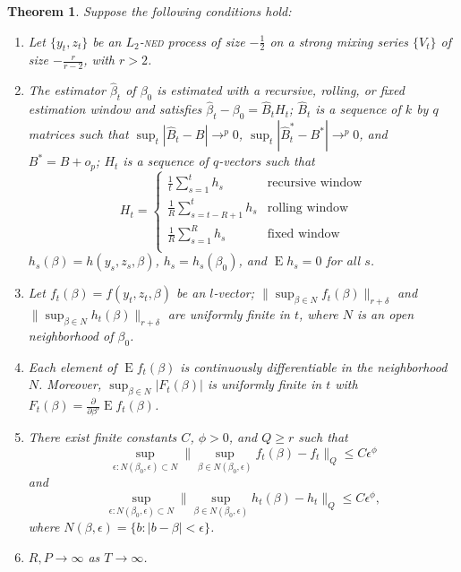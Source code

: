\documentclass[11pt,fleqn]{article}
\newtheorem{thm}{Theorem}
\theoremstyle{definition}
\DeclareMathOperator{\E}{E}
\newcommand{\dd}[1]{\frac{\partial}{\partial #1}}
\newcommand{\ned}{\textsc{ned}}
\begin{document}
\begin{thm}\label{res:3}
  Suppose the following conditions hold:
  \begin{enumerate}
  \item Let $\{y_t, z_t\}$ be an $L_2$-\textsl{\ned} process of size $-\frac12$ on
    a strong mixing series $\{V_t\}$ of size $-\frac{r}{r-2}$, with $r
    > 2$.
  \item The estimator $\hat{\beta}_t$ of $\beta_0$ is estimated with a
    recursive, rolling, or fixed estimation window and satisfies
    $\hat{\beta}_{t} - \beta_{0} = \hat{B}_{t} H_t$; $\hat{B}_{t}$ is
    a sequence of $k$ by $q$ matrices such that $\sup_t |\hat{B}_t -
    B| \to^p 0$, $\sup_t |\hat{B}_t^{*} - B^{*}| \to^p 0$, and $B^{*}
    = B + o_p$; $H_{t}$ is a sequence of $q$-vectors such that 
    \begin{equation}
      H_{t} = \begin{cases} 
        \tfrac1t \sum_{s=1}^t h_{s} & \text{recursive window} \\
        \tfrac1R \sum_{s=t-R+1}^t h_{s} & \text{rolling window} \\
        \tfrac1R \sum_{s=1}^R h_{s} & \text{fixed window} \\
      \end{cases}
    \end{equation}
    $h_{s}(\beta) = h(y_{s}, z_{s}, \beta)$, $h_s = h_s(\beta_0)$, and
    $\E h_{s} = 0$ for all $s$.
  \item Let $f_{t}(\beta) = f(y_{t}, z_{t}, \beta)$ be an $l$-vector;
    $\| \sup_{\beta \in N} f_{t}(\beta) \|_{r+\delta}$ and $\|
    \sup_{\beta \in N} h_{t}(\beta) \|_{r+\delta}$ are uniformly
    finite in $t$, where $N$ is an open neighborhood of $\beta_{0}$.
  \item Each element of $\E f_{t}(\beta)$ is continuously
    differentiable in the neighborhood $N$.  Moreover, $\sup_{\beta
      \in N} | F_{t}(\beta) |$ is uniformly finite in $t$ with
    $F_{t}(\beta) = \dd{\beta'} \E f_{t}(\beta)$.
  \item There exist finite constants $C$, $\phi > 0$, and $Q \geq r$
    such that \[\sup_{\epsilon : N(\beta_{0}, \epsilon) \subset N}\|
    \sup_{\beta \in N(\beta_{0}, \epsilon)} f_{t}(\beta) - f_{t} \|_Q
    \leq C \epsilon^{\phi}\] and \[\sup_{\epsilon : N(\beta_{0},
      \epsilon) \subset N}\| \sup_{\beta \in N(\beta_{0}, \epsilon)}
    h_{t}(\beta) - h_{t} \|_Q \leq C \epsilon^{\phi},\] where
    $N(\beta, \epsilon) = \{b : |b - \beta| < \epsilon\}$.
  \item $R, P \to \infty$ as $T \to \infty$.

\end{enumerate}
\end{thm}
\end{document}
